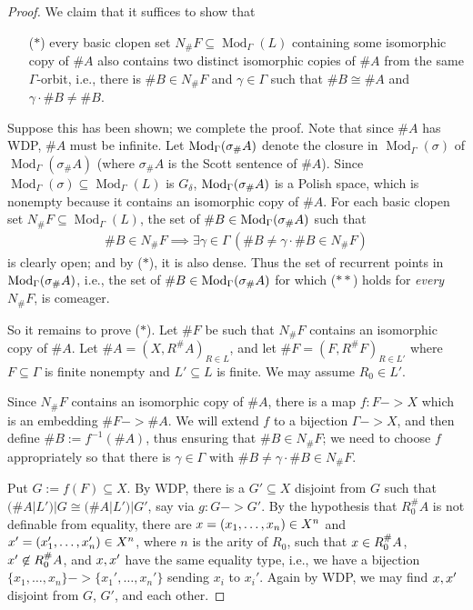 \documentclass[11pt]{article}
\DeclareMathOperator\Mod{Mod}
\begin{document}
\begin{proof}
We claim that it suffices to show that
\begin{enumerate}
\item[($*$)]  every basic clopen set $N_\#F \subseteq \Mod_\Gamma(L)$ containing some isomorphic copy of $\#A$ also contains two distinct isomorphic copies of $\#A$ from the same $\Gamma$-orbit, i.e., there is $\#B \in N_\#F$ and $\gamma \in \Gamma$ such that $\#B \cong \#A$ and $\gamma \cdot \#B \ne \#B$.
\end{enumerate}

Suppose this has been shown; we complete the proof.  Note that since $\#A$ has WDP, $\#A$ must be infinite.  Let $\-{\Mod_\Gamma(\sigma_\#A)}$ denote the closure in $\Mod_\Gamma(\sigma)$ of $\Mod_\Gamma(\sigma_\#A)$ (where $\sigma_\#A$ is the Scott sentence of $\#A$).  Since $\Mod_\Gamma(\sigma) \subseteq \Mod_\Gamma(L)$ is $G_\delta$, $\-{\Mod_\Gamma(\sigma_\#A)}$ is a Polish space, which is nonempty because it contains an isomorphic copy of $\#A$.  For each basic clopen set $N_\#F \subseteq \Mod_\Gamma(L)$, the set of $\#B \in \-{\Mod_\Gamma(\sigma_\#A)}$ such that
\begin{align*}
\#B \in N_\#F  \implies  \exists \gamma \in \Gamma\, (\#B \ne \gamma \cdot \#B \in N_\#F)  \tag{$**$}
\end{align*}
is clearly open; and by ($*$), it is also dense.  Thus the set of recurrent points in $\-{\Mod_\Gamma(\sigma_\#A)}$, i.e., the set of $\#B \in \-{\Mod_\Gamma(\sigma_\#A)}$ for which ($**$) holds for \emph{every} $N_\#F$, is comeager.

So it remains to prove ($*$).  Let $\#F$ be such that $N_\#F$ contains an isomorphic copy of $\#A$.  Let $\#A = (X, R^\#A)_{R \in L}$, and let $\#F = (F, R^\#F)_{R \in L'}$ where $F \subseteq \Gamma$ is finite nonempty and $L' \subseteq L$ is finite.  We may assume $R_0 \in L'$.

Since $N_\#F$ contains an isomorphic copy of $\#A$, there is a map $f : F -> X$ which is an embedding $\#F -> \#A$.  We will extend $f$ to a bijection $\Gamma -> X$, and then define $\#B := f^{-1}(\#A)$, thus ensuring that $\#B \in N_\#F$; we need to choose $f$ appropriately so that there is $\gamma \in \Gamma$ with $\#B \ne \gamma \cdot \#B \in N_\#F$.

Put $G := f(F) \subseteq X$.  By WDP, there is a $G' \subseteq X$ disjoint from $G$ such that $(\#A|L')|G \cong (\#A|L')|G'$, say via $g : G -> G'$.  By the hypothesis that $R_0^\#A$ is not definable from equality, there are $\-x = (x_1, \dotsc, x_n) \in X^n$ and $\-x' = (x_1', \dotsc, x_n') \in X^n$, where $n$ is the arity of $R_0$, such that $\-x \in R_0^\#A$, $\-x' \not\in R_0^\#A$, and $\-x, \-x'$ have the same equality type, i.e., we have a bijection $\{x_1, \dotsc, x_n\} -> \{x_1', \dotsc, x_n'\}$ sending $x_i$ to $x_i'$.  Again by WDP, we may find $\-x, \-x'$ disjoint from $G$, $G'$, and each other.


\end{proof}
\end{document}
